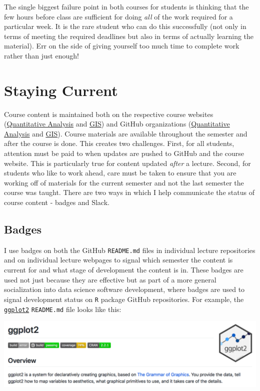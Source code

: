 \documentclass[]{book}
\theoremstyle{definition}
\theoremstyle{definition}
\theoremstyle{definition}
\theoremstyle{remark}
\begin{document}
The single biggest failure point in both courses for students is
thinking that the few hours before class are sufficient for doing
\emph{all} of the work required for a particular week. It is the rare
student who can do this successfully (not only in terms of meeting the
required deadlines but also in terms of actually learning the material).
Err on the side of giving yourself too much time to complete work rather
than just enough!

\section{Staying Current}\label{staying-current}

Course content is maintained both on the respective course websites
(\href{https://slu-soc5050.github.io}{Quantitative Analysis} and
\href{https://slu-soc5650.github.io}{GIS}) and GitHub organizations
(\href{https://github.com/slu-soc5050}{Quantitative Analysis} and
\href{https://github.com/slu-soc5650}{GIS}). Course materials are
available throughout the semester and after the course is done. This
creates two challenges. First, for all students, attention must be paid
to when updates are pushed to GitHub and the course website. This is
particularly true for content updated \emph{after} a lecture. Second,
for students who like to work ahead, care must be taken to ensure that
you are working off of materials for the current semester and not the
last semester the course was taught. There are two ways in which I help
communicate the status of course content - badges and Slack.

\hypertarget{badges}{\subsection{Badges}\label{badges}}

I use badges on both the GitHub \texttt{README.md} files in individual
lecture repositories and on individual lecture webpages to signal which
semester the content is current for and what stage of development the
content is in. These badges are used not just because they are effective
but as part of a more general socialization into data science software
development, where badges are used to signal development status on
\texttt{R} package GitHub repositories. For example, the
\href{https://github.com/tidyverse/ggplot2}{\texttt{ggplot2}}
\texttt{README.md} file looks like this:

\begin{center}\includegraphics[width=0.95\linewidth]{images/ggplot2Readme} \end{center}
\end{document}
